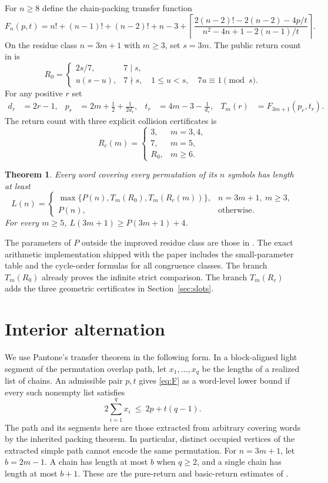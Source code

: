 \documentclass[11pt]{article}
\newtheorem{theorem}{Theorem}
\newcommand{\ceil}[1]{\left\lceil #1\right\rceil}
\begin{document}
For $n\ge8$ define the chain-packing transfer function
\begin{equation}\label{eq:F}
 F_n(p,t)=n!+(n-1)!+(n-2)!+n-3+
 \ceil{\frac{2(n-2)!-2(n-2)-4p/t}{n^2-4n+1-2(n-1)/t}} .
\end{equation}
On the residue class $n=3m+1$ with $m\ge3$, set $s=3m$.
The public return count in \cite{pantone} is
\[
 R_0=\begin{cases}
  2s/7,&7\mid s,\\
  u(s-u),&7\nmid s,\quad 1\le u<s,\quad 7u\equiv1\pmod s.
 \end{cases}
\]
For any positive $r$ set
\begin{align}
 d_r&=2r-1,&
 p_r&=2m+\tfrac12+\tfrac{1}{2d_r},&
 t_r&=4m-3-\tfrac1{d_r},&
 T_m(r)&=F_{3m+1}(p_r,t_r). \label{eq:prices}
\end{align}
The return count with three explicit collision certificates is
\[
 R_c(m)=
 \begin{cases}3,&m=3,4,\\7,&m=5,\\R_0,&m\ge6.\end{cases}
\]
\begin{theorem}\label{thm:main}
Every word covering every permutation of its $n$ symbols has length at least
\begin{equation}\label{eq:main}
 L(n)=\begin{cases}
 \max\{P(n),T_m(R_0),T_m(R_c(m))\},& n=3m+1,\ m\ge3,\\
 P(n),&\text{otherwise}.
 \end{cases}
\end{equation}
For every $m\ge5$, $L(3m+1)\ge P(3m+1)+4$.
\end{theorem}

The parameters of $P$ outside the improved residue class are those in
\cite{record34}. The exact arithmetic implementation shipped with the paper
includes the small-parameter table and the cycle-order formulas for all
congruence classes. The branch $T_m(R_0)$ already proves the infinite
strict comparison. The branch $T_m(R_c)$ adds the three geometric
certificates in Section~\ref{sec:slots}.

\section{Interior alternation}
We use Pantone's transfer theorem \cite{pantone} in the following form.
In a block-aligned light segment of the permutation overlap path, let
$x_1,\ldots,x_q$ be the lengths of a realized list of chains. An admissible
pair $p,t$ gives \eqref{eq:F} as a word-level lower bound if every such
nonempty list satisfies
\begin{equation}\label{eq:allow}
 2\sum_{i=1}^q x_i\ \le\ 2p+t(q-1).
\end{equation}
The path and its segments here are those extracted from arbitrary covering
words by the inherited packing theorem. In particular, distinct occupied
vertices of the extracted simple path cannot encode the same permutation.
For $n=3m+1$, let $b=2m-1$. A chain has length at most $b$ when $q\ge2$,
and a single chain has length at most $b+1$. These are the pure-return and
basic-return estimates of \cite{pantone}.
\end{document}
